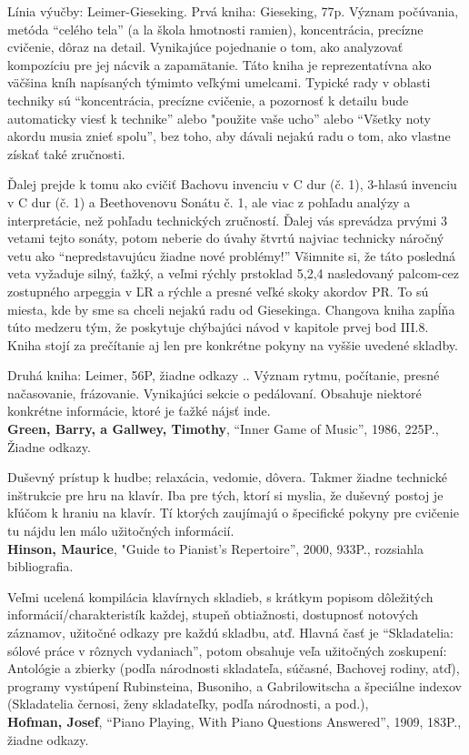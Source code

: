 \documentclass[11pt,a4paper]{book}
\begin{document}
Línia výučby: Leimer-Gieseking. Prvá kniha: Gieseking, 77p. Význam počúvania, metóda “celého tela” (a la škola hmotnosti ramien), koncentrácia, precízne cvičenie, dôraz na detail. Vynikajúce pojednanie o tom, ako analyzovať kompozíciu pre jej nácvik a zapamätanie. Táto kniha je reprezentatívna ako väčšina kníh napísaných týmimto veľkými umelcami. Typické rady v oblasti techniky sú “koncentrácia, precízne cvičenie, a pozornosť k detailu bude automaticky viesť k technike” alebo "použite vaše ucho” alebo “Všetky noty akordu musia znieť spolu”, bez toho, aby dávali nejakú radu o tom, ako vlastne získať také zručnosti. 

Ďalej prejde k tomu ako cvičiť Bachovu invenciu v C dur (č. 1), 3-hlasú invenciu v C dur (č. 1) a Beethovenovu Sonátu č. 1, ale viac z pohľadu analýzy a interpretácie, než pohľadu technických zručností. Ďalej vás sprevádza prvými 3 vetami tejto sonáty, potom neberie do úvahy štvrtú najviac technicky náročný vetu ako “nepredstavujúcu žiadne nové problémy!” Všimnite si, že táto posledná veta  vyžaduje silný, ťažký, a veľmi rýchly prstoklad 5,2,4 nasledovaný palcom-cez zostupného arpeggia v ĽR a rýchle a presné veľké skoky akordov PR. To sú miesta, kde by sme sa chceli nejakú radu od Giesekinga. Changova kniha zapĺňa túto medzeru tým, že poskytuje chýbajúci návod v kapitole prvej bod III.8. Kniha stojí za prečítanie aj len pre konkrétne pokyny na vyššie uvedené skladby. 

Druhá kniha: Leimer, 56P, žiadne odkazy .. Význam rytmu, počítanie, presné načasovanie, frázovanie. Vynikajúci sekcie o pedálovaní. Obsahuje niektoré konkrétne informácie, ktoré je ťažké nájsť inde.
\medskip\\
\textbf{Green, Barry, a Gallwey, Timothy}, “Inner Game of Music”, 1986, 225P., Žiadne odkazy. 

Duševný prístup k hudbe; relaxácia, vedomie, dôvera. Takmer žiadne technické inštrukcie pre hru na klavír. Iba pre tých, ktorí si myslia, že duševný postoj je kľúčom k hraniu na klavír. Tí ktorých zaujímajú o špecifické pokyny pre cvičenie tu nájdu len málo užitočných informácií.
\medskip\\
\textbf{Hinson, Maurice}, "Guide to Pianist’s Repertoire”, 2000, 933P., rozsiahla bibliografia. 

Veľmi ucelená kompilácia klavírnych skladieb, s krátkym popisom dôležitých informácií/cha\-rak\-te\-ris\-tík každej, stupeň obtiažnosti, dostupnosť notových záznamov, užitočné odkazy pre každú skladbu, atď. Hlavná časť je “Skladatelia: sólové práce v rôznych vydaniach”, potom obsahuje veľa užitočných zoskupení: Antológie a zbierky (podľa národnosti skladateľa, súčasné, Bachovej rodiny, atď), programy vystúpení Rubinsteina, Busoniho, a Gabrilowitscha a špeciálne indexov (Skladatelia černosi, ženy skladateľky, podľa národnosti, a pod.), 
\medskip\\
\textbf{Hofman, Josef}, “Piano Playing, With Piano Questions Answered”, 1909, 183P., žiadne odkazy.
\end{document}
